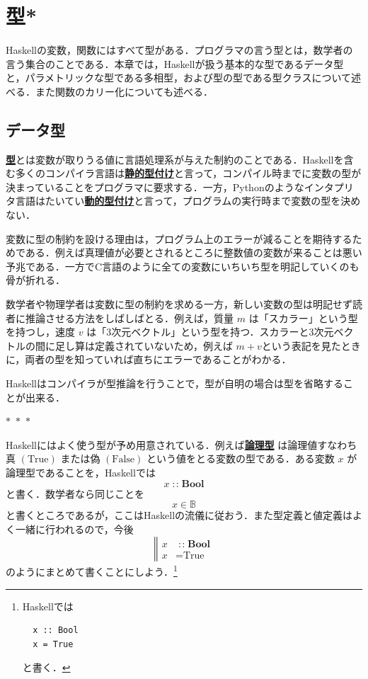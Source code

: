 \documentclass[a5paper,twoside,fleqn,draft]{jsbook}
\newcommand{\separator}{\begin{center}$*$~$*$~$*$\end{center}}
\newcommand{\programminglanguage}[1]{\textsf{#1}}
\newcommand{\clang}{\programminglanguage{C}}
\newcommand{\haskell}{\programminglanguage{Haskell}}
\newcommand{\python}{\programminglanguage{Python}}
\newenvironment{leader}{\begingroup\gt}{\endgroup}
\newcommand{\keyword}[1]{{\underline{\textbf{#1}}}}
\newcommand{\mBrace}{\Vert}
\newcommand{\mSpecialConstant}[1]{\textrm{#1}}
\newcommand{\mFalse}{\mSpecialConstant{False}}
\newcommand{\mTrue}{\mSpecialConstant{True}}
\DeclareMathOperator{\mIn}{{:\!:}}
\newcommand{\mSpecialSet}[1]{\mathbb{#1}}
\newcommand{\mBSet}{\mSpecialSet{B}}
\newcommand{\mType}[1]{\mathbf{#1}} %
\newcommand{\mBoolType}{\mType{Bool}}
\begin{document}
\chapter{型*}
\label{ch:type}

\begin{leader}
\haskell の変数，関数にはすべて型がある．プログラマの言う型とは，数学者の言う集合のことである．本章では，\haskell が扱う基本的な型であるデータ型と，パラメトリックな型である多相型，および型の型である型クラスについて述べる．また関数のカリー化についても述べる．
\end{leader}

\section{データ型}

\keyword{型}とは変数が取りうる値に言語処理系が与えた制約のことである．\haskell を含む多くのコンパイラ言語は\keyword{静的型付け}と言って，コンパイル時までに変数の型が決まっていることをプログラマに要求する．一方，\python のようなインタプリタ言語はたいてい\keyword{動的型付け}と言って，プログラムの実行時まで変数の型を決めない．

変数に型の制約を設ける理由は，プログラム上のエラーが減ることを期待するためである．例えば真理値が必要とされるところに整数値の変数が来ることは悪い予兆である．一方で\clang 言語のように全ての変数にいちいち型を明記していくのも骨が折れる．

数学者や物理学者は変数に型の制約を求める一方，新しい変数の型は明記せず読者に推論させる方法をしばしばとる．例えば，質量 $m$ は「スカラー」という型を持つし，速度 $v$ は「3次元ベクトル」という型を持つ．スカラーと3次元ベクトルの間に足し算は定義されていないため，例えば $m+v$という表記を見たときに，両者の型を知っていれば直ちにエラーであることがわかる．

\haskell はコンパイラが型推論を行うことで，型が自明の場合は型を省略することが出来る．

\separator

\haskell にはよく使う型が予め用意されている．例えば\keyword{論理型} は論理値すなわち真 $(\mTrue)$ または偽 $(\mFalse)$ という値をとる変数の型である．ある変数 $x$ が論理型であることを，\haskell では
\begin{equation}
  x
  \mIn\mBoolType
\end{equation}
と書く．数学者なら同じことを
\begin{equation}
  x
  \in\mBSet
\end{equation}
と書くところであるが，ここは\haskell の流儀に従おう．また型定義と値定義はよく一緒に行われるので，今後
\begin{equation}
  \left\mBrace
  \begin{aligned}
    x
    &\mIn\mBoolType\\
    x
    &=\mTrue
  \end{aligned}
  \right.
\end{equation}
のようにまとめて書くことにしよう．\footnote{\haskell では
\begin{verbatim}
  x :: Bool
  x = True
\end{verbatim}
と書く．}
\end{document}
